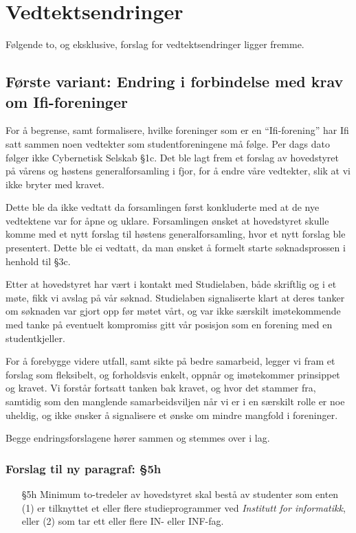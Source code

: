 \documentclass[10pt,norsk,a4paper]{article}
\begin{document}
\newpage

\section{Vedtektsendringer}
Følgende to, og eksklusive, forslag for vedtektsendringer ligger fremme.

\subsection{Første variant: Endring i forbindelse med krav om Ifi-foreninger}\label{sec:ifi-forslag}

For å begrense, samt formalisere, hvilke foreninger som er en ``Ifi-forening''
har Ifi satt sammen noen vedtekter som studentforeningene må følge.  Per dags
dato følger ikke Cybernetisk Selskab §1c\footnotemark. Det ble lagt frem et
forslag av hovedstyret på vårens og høstens generalforsamling i fjor, for å
endre våre vedtekter, slik at vi ikke bryter med kravet.



Dette ble da ikke vedtatt da forsamlingen først konkluderte med at de nye vedtektene var for åpne og uklare.
Forsamlingen ønsket at hovedstyret skulle komme med et nytt forslag til høstens generalforsamling, hvor et
nytt forslag ble presentert. Dette ble ei vedtatt, da man ønsket å formelt starte søknadsprossen i henhold
til §3c.

Etter at hovedstyret har vært i kontakt med Studielaben, både skriftlig og i et møte, fikk vi avslag på vår
søknad. Studielaben signaliserte klart at deres tanker om søknaden var gjort opp før møtet vårt, og
var ikke særskilt imøtekommende med tanke på eventuelt kompromiss gitt vår posisjon som en forening med
en studentkjeller.

For å forebygge videre utfall, samt sikte på bedre samarbeid, legger vi fram et forslag som fleksibelt, og
forholdsvis enkelt, oppnår og imøtekommer prinsippet og kravet. Vi forstår fortsatt tanken bak kravet, og
hvor det stammer fra, samtidig som den manglende samarbeidsviljen når vi er i en særskilt rolle er
noe uheldig, og ikke ønsker å signalisere et ønske om mindre mangfold i foreninger.

Begge endringsforslagene hører sammen og stemmes over i lag.

\subsubsection{Forslag til ny paragraf: §5h}
\begin{enumerate}
	\item[§5h] Minimum to-tredeler av hovedstyret skal bestå av studenter som enten (1) er tilknyttet et eller flere studieprogrammer ved \textit{Institutt for informatikk}, eller (2) som tar ett eller flere IN- eller INF-fag.
\end{enumerate}
\end{document}
